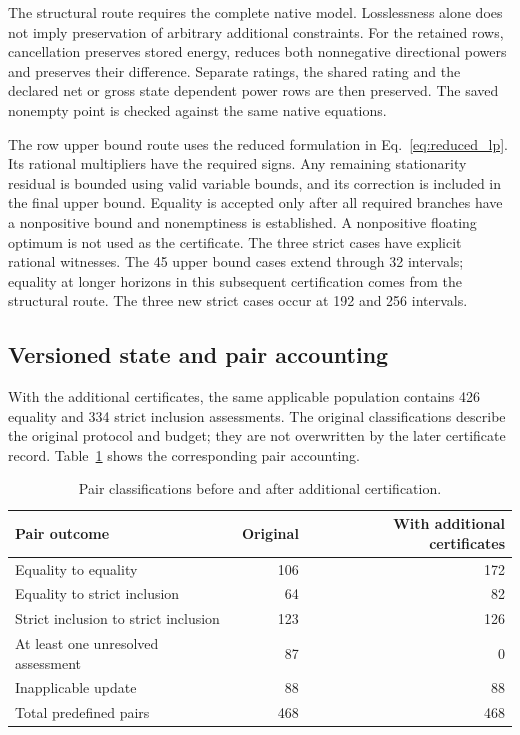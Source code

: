 The structural route requires the complete native model. Losslessness alone
does not imply preservation of arbitrary additional constraints. For the
retained rows, cancellation preserves stored energy, reduces both
nonnegative directional powers and preserves their difference. Separate
ratings, the shared rating and the declared net or gross state dependent
power rows are then preserved. The saved nonempty point is checked against
the same native equations.

The row upper bound route uses the reduced formulation in
Eq.~\eqref{eq:reduced_lp}. Its rational multipliers have the required signs.
Any remaining stationarity residual is bounded using valid variable bounds,
and its correction is included in the final upper bound. Equality is
accepted only after all required branches have a nonpositive bound and
nonemptiness is established. A nonpositive floating optimum is not used as
the certificate. The three strict cases have explicit rational witnesses.
The 45 upper bound cases extend through 32 intervals; equality at longer
horizons in this subsequent certification comes from the structural route. The three
new strict cases occur at 192 and 256 intervals.

\subsection{Versioned state and pair accounting}
With the additional certificates, the same applicable population contains
426 equality and 334 strict inclusion assessments. The original
classifications describe the original protocol and budget; they are not
overwritten by the later certificate record. Table~\ref{tab:sat_pair_accounting}
shows the corresponding pair accounting.

\begin{table}[htbp]
\caption{Pair classifications before and after additional certification.}
\label{tab:sat_pair_accounting}
\begin{tabular}{@{}lrr@{}}\toprule
Pair outcome & Original & With additional certificates\\\midrule
Equality to equality & 106 & 172\\
Equality to strict inclusion & 64 & 82\\
Strict inclusion to strict inclusion & 123 & 126\\
At least one unresolved assessment & 87 & 0\\
Inapplicable update & 88 & 88\\\midrule
Total predefined pairs & 468 & 468\\\bottomrule
\end{tabular}
\end{table}

